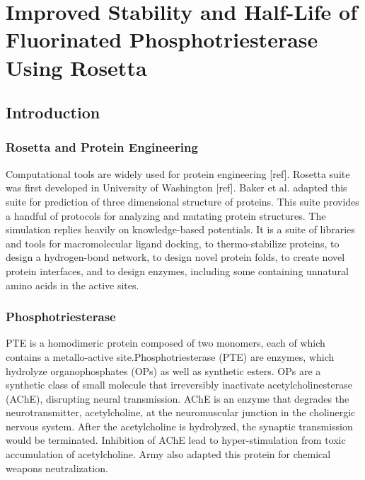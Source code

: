 \chapter{Improved Stability and Half-Life of Fluorinated Phosphotriesterase
Using Rosetta} 
\label{chap:rosetta} 
\begin{refsection}

\section{Introduction}

\subsection{Rosetta and Protein Engineering}
\label{sec:rosetta}

Computational tools are widely used for protein engineering [ref]. Rosetta
suite was first developed in University of Washington [ref]. Baker et al.
adapted this suite for prediction of three dimensional structure of proteins.
This suite provides a handful of protocols for analyzing and mutating protein
structures. The simulation replies heavily on knowledge-based potentials. It is
a suite of libraries and tools for macromolecular ligand docking, to
thermo-stabilize proteins, to design a hydrogen-bond network, to design novel
protein folds, to create novel protein interfaces, and to design enzymes,
including some containing unnatural amino acids in the active sites. 

\subsection{Phosphotriesterase} 
\label{sec:pte}

PTE is a homodimeric protein composed of two monomers, each of which contains a
metallo-active site.Phosphotriesterase (PTE) are enzymes, which hydrolyze
organophosphates (OPs) as well as synthetic esters.\cite{Ghanem2005a} OPs are a
synthetic class of small molecule that irreversibly inactivate
acetylcholinesterase (AChE), disrupting neural transmission. AChE is an enzyme
that degrades the neurotransmitter, acetylcholine, at the neuromuscular
junction in the cholinergic nervous system. After the acetylcholine is
hydrolyzed, the synaptic transmission would be terminated. Inhibition of AChE
lead to hyper-stimulation from toxic accumulation of
acetylcholine.\cite{Soreq2001} Army also adapted this protein for chemical
weapons neutralization. \cite{Yang2014a}


\end{refsection}
